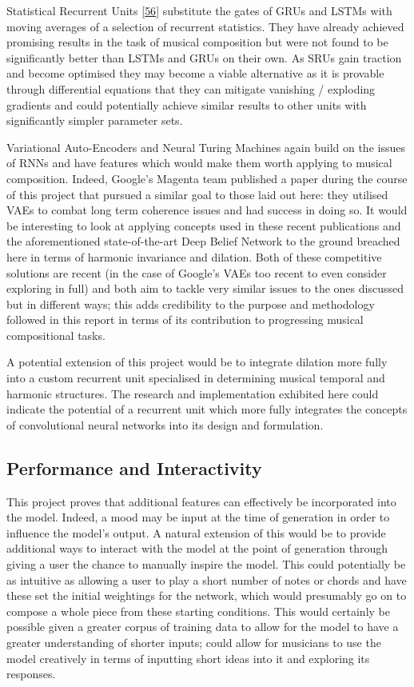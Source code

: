 \documentclass[12pt,]{article}
\begin{document}
Statistical Recurrent Units
{[}\protect\hyperlink{ref-oliva2017statistical}{56}{]} substitute the
gates of GRUs and LSTMs with moving averages of a selection of recurrent
statistics. They have already achieved promising results in the task of
musical composition but were not found to be significantly better than
LSTMs and GRUs on their own. As SRUs gain traction and become optimised
they may become a viable alternative as it is provable through
differential equations that they can mitigate vanishing / exploding
gradients and could potentially achieve similar results to other units
with significantly simpler parameter sets.

Variational Auto-Encoders and Neural Turing Machines again build on the
issues of RNNs and have features which would make them worth applying to
musical composition. Indeed, Google's Magenta team published a paper
during the course of this project that pursued a similar goal to those
laid out here: they utilised VAEs to combat long term coherence issues
and had success in doing so. It would be interesting to look at applying
concepts used in these recent publications and the aforementioned
state-of-the-art Deep Belief Network to the ground breached here in
terms of harmonic invariance and dilation. Both of these competitive
solutions are recent (in the case of Google's VAEs too recent to even
consider exploring in full) and both aim to tackle very similar issues
to the ones discussed but in different ways; this adds credibility to
the purpose and methodology followed in this report in terms of its
contribution to progressing musical compositional tasks.

A potential extension of this project would be to integrate dilation
more fully into a custom recurrent unit specialised in determining
musical temporal and harmonic structures. The research and
implementation exhibited here could indicate the potential of a
recurrent unit which more fully integrates the concepts of convolutional
neural networks into its design and formulation.

\hypertarget{performance-and-interactivity}{%
\subsection{Performance and
Interactivity}\label{performance-and-interactivity}}

This project proves that additional features can effectively be
incorporated into the model. Indeed, a mood may be input at the time of
generation in order to influence the model's output. A natural extension
of this would be to provide additional ways to interact with the model
at the point of generation through giving a user the chance to manually
inspire the model. This could potentially be as intuitive as allowing a
user to play a short number of notes or chords and have these set the
initial weightings for the network, which would presumably go on to
compose a whole piece from these starting conditions. This would
certainly be possible given a greater corpus of training data to allow
for the model to have a greater understanding of shorter inputs; could
allow for musicians to use the model creatively in terms of inputting
short ideas into it and exploring its responses.
\end{document}
